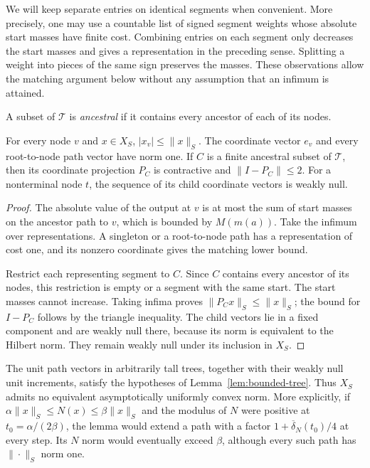 We will keep separate entries on identical segments when convenient.
More precisely, one may use a countable list of signed segment weights
whose absolute start masses have finite cost. Combining entries on each
segment only decreases the start masses and gives a representation in
the preceding sense. Splitting a weight into pieces of the same sign
preserves the masses. These observations allow the matching argument
below without any assumption that an infimum is attained.

A subset of $\mathcal T$ is \emph{ancestral} if it contains every ancestor
of each of its nodes.

\begin{lemma}\label{sm:s:coordinates}
For every node $v$ and $x\in X_S$, $|x_v|\le\|x\|_S$. The coordinate vector
$e_v$ and every root-to-node path vector have norm one. If $C$ is a finite
ancestral subset of $\mathcal T$, then its coordinate projection $P_C$ is
contractive and $\|I-P_C\|\le2$. For a nonterminal node $t$, the sequence
of its child coordinate vectors is weakly null.
\end{lemma}
\begin{proof}
The absolute value of the output at $v$ is at most the sum of start
masses on the ancestor path to $v$, which is bounded by $M(m(a))$.
Take the infimum over representations. A singleton or a root-to-node
path has a representation of cost one, and its nonzero coordinate gives
the matching lower bound.

Restrict each representing segment to $C$. Since $C$ contains every
ancestor of its nodes, this restriction is empty or a segment with the
same start. The start masses cannot increase. Taking infima proves
$\|P_Cx\|_S\le\|x\|_S$; the bound for $I-P_C$ follows by the triangle
inequality. The child vectors lie in a fixed component and are weakly
null there, because its norm is equivalent to the Hilbert norm. They
remain weakly null under its inclusion in $X_S$.
\end{proof}

The unit path vectors in arbitrarily tall trees, together with their
weakly null unit increments, satisfy the hypotheses of
Lemma~\ref{lem:bounded-tree}. Thus $X_S$ admits no equivalent asymptotically
uniformly convex norm. More explicitly, if
$\alpha\|x\|_S\le N(x)\le\beta\|x\|_S$ and the modulus of $N$ were positive
at $t_0=\alpha/(2\beta)$, the lemma would extend a path with a factor
$1+\overline\delta_N(t_0)/4$ at every step. Its $N$ norm would eventually
exceed $\beta$, although every such path has $\|\cdot\|_S$ norm one.

